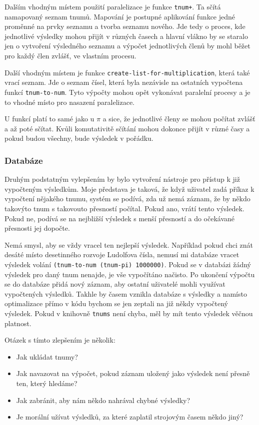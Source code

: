 Dalším vhodným místem použití paralelizace je funkce \texttt{tnum+}. Ta sčítá namapovaný seznam tnumů. Mapování je postupné aplikování funkce jedné proměnné na prvky seznamu a tvorba seznamu nového. Jde tedy o proces, kde jednotlivé výsledky mohou přijít v různých časech a hlavní vlákno by se staralo jen o vytvoření výsledného seznamu a výpočet jednotlivých členů by mohl běžet pro každý člen zvlášť, ve vlastním procesu.

Další vhodným místem je funkce \texttt{create-list-for-multiplication}, která také vrací seznam. Jde o seznam čísel, která byla nezávisle na ostatních vypočtena funkcí \texttt{tnum-to-num}. Tyto výpočty mohou opět vykonávat paralelní procesy a je to vhodné místo pro nasazení paralelizace.

U funkcí platí to samé jako u $\pi$ a sice, že jednotlivé členy se mohou počítat zvlášť a až poté sčítat. Kvůli komutativitě sčítání mohou dokonce přijít v různé časy a pokud budou všechny, bude výsledek v pořádku.

\subsubsection{Databáze}
Druhým podstatným vylepšením by bylo vytvoření nástroje pro přístup k již vypočteným výsledkům. Moje představa je taková, že když uživatel zadá příkaz k vypočtení nějakého tnumu, systém se podívá, zda už nemá záznam, že by někdo takovýto tnum s takovouto přesností počítal. Pokud ano, vrátí tento výsledek. Pokud ne, podívá se na nejbližší výsledek s menší přesností a do očekávané přesnosti jej dopočte.

Nemá smysl, aby se vždy vracel ten nejlepší výsledek. Například pokud chci znát desáté místo desetinného rozvoje Ludolfova čísla, nemusí mi databáze vracet výsledek volání \texttt{(tnum-to-num (tnum-pi) 1000000)}. Pokud se v databázi žádný výsledek pro daný tnum nenajde, je vše vypočítáno načisto. Po ukončení výpočtu se do databáze přidá nový záznam, aby ostatní uživatelé mohli využívat vypočtených výsledků. Takhle by časem vznikla databáze s výsledky a namísto optimalizace přímo v kódu bychom se jen zeptali na již někdy vypočtený výsledek. Pokud v knihovně \texttt{tnums} není chyba, měl by mít tento výsledek věčnou platnost.

Otázek s tímto zlepšením je několik:
\begin{itemize}
\item{Jak ukládat tnumy?}
\item{Jak navazovat na výpočet, pokud záznam uložený jako výsledek není přesně ten, který hledáme?}
\item{Jak zabránit, aby nám někdo nahrával chybné výsledky?}
\item{Je morální užívat výsledků, za které zaplatil strojovým časem někdo jiný?}
\end{itemize}

